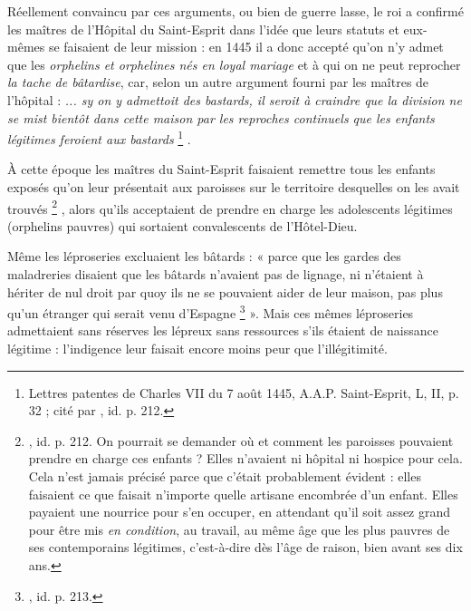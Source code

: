  Réellement convaincu par ces arguments, ou bien de guerre lasse, le roi a confirmé les maîtres de l'Hôpital du Saint-Esprit dans l'idée que leurs statuts et eux-mêmes se faisaient de leur mission : en 1445 il a donc accepté qu'on n'y admet que les \emph{orphelins et orphelines nés en loyal mariage} et à qui on ne peut reprocher \emph{la tache de bâtardise}, car, selon un autre argument fourni par les maîtres de l'hôpital : \emph{... sy on y admettoit des bastards, il seroit à craindre que la division ne se mist bientôt dans cette maison par les reproches continuels que les enfants légitimes feroient aux bastards}%
\footnote{Lettres patentes de Charles VII du 7 août 1445, A.A.P. Saint-Esprit, L, II, p. 32 ; cité par , id. p. 212.}%
.

 À cette époque les maîtres du Saint-Esprit faisaient remettre tous les enfants exposés qu'on leur présentait aux paroisses sur le territoire desquelles on les avait trouvés%
\footnote{, id. p. 212. On pourrait se demander où et comment les paroisses pouvaient prendre en charge ces enfants ? Elles n'avaient ni hôpital ni hospice pour cela. Cela n'est jamais précisé parce que c'était probablement évident : elles faisaient ce que faisait n'importe quelle artisane encombrée d'un enfant. Elles payaient une nourrice pour s'en occuper, en attendant qu'il soit assez grand pour être mis \emph{en condition}, au travail, au même âge que les plus pauvres de ses contemporains légitimes, c'est-à-dire dès l'âge de raison, bien avant ses dix ans.}%
, alors qu'ils acceptaient de prendre en charge les adolescents légitimes (orphelins pauvres) qui sortaient convalescents de l'Hôtel-Dieu. 

 Même les léproseries excluaient les bâtards : « parce que les gardes des maladreries disaient que les bâtards n'avaient pas de lignage, ni n'étaient à hériter de nul droit par quoy ils ne se pouvaient aider de leur maison, pas plus qu'un étranger qui serait venu d'Espagne%
\footnote{, id. p. 213.} 
». Mais ces mêmes léproseries admettaient sans réserves les lépreux sans ressources s'ils étaient de naissance légitime : l'indigence leur faisait encore moins peur que l'illégitimité.

